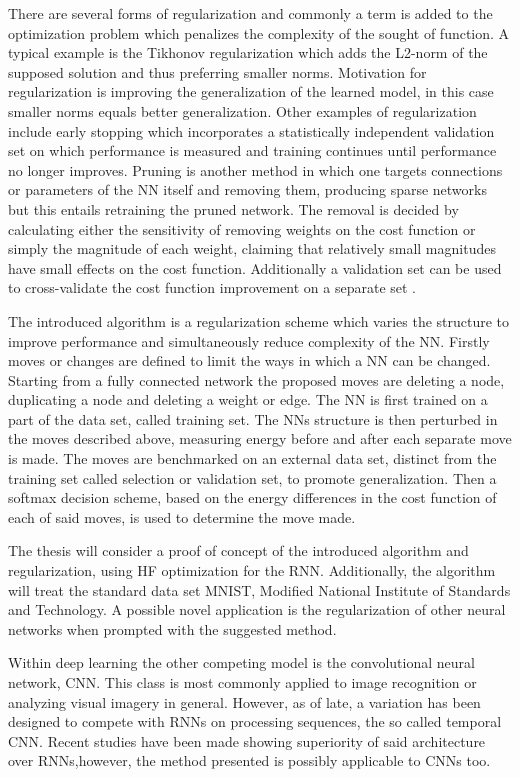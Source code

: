There are several forms of regularization and commonly a term is added to the optimization problem which penalizes the complexity of the sought of function. A typical example is the Tikhonov regularization which adds the L2-norm of the supposed solution and thus preferring smaller norms. Motivation for regularization is improving the generalization of the learned model, in this case smaller norms equals better generalization. Other examples of regularization include early stopping which incorporates a statistically independent validation set on which performance is measured and training continues until performance no longer improves. Pruning is another method in which one targets connections or parameters of the NN itself and removing them, producing sparse networks but this entails retraining the pruned network. The removal is decided by calculating either the sensitivity of removing weights on the cost function or simply the magnitude of each weight, claiming that relatively small magnitudes have small effects on the cost function. Additionally a validation set can be used to cross-validate the cost function improvement on a separate set \cite{prunings}. 

The introduced algorithm is a regularization scheme which varies the structure to improve performance and simultaneously reduce complexity of the NN. Firstly moves or changes are defined to limit the ways in which a NN can be changed. Starting from a fully connected network the proposed moves are deleting a node, duplicating a node and deleting a weight or edge. The NN is first trained on a part of the data set, called training set. The NNs structure is then perturbed in the moves described above, measuring energy before and after each separate move is made. The moves are benchmarked on an external data set, distinct from the training set called selection or validation set, to promote generalization. Then a softmax decision scheme, based on the energy differences in the cost function of each of said moves, is used to determine the move made. 

The thesis will consider a proof of concept of the introduced algorithm and regularization, using HF optimization for the RNN. Additionally, the algorithm will treat the standard data set MNIST, Modified National Institute of Standards and Technology\cite{mnist}. A possible novel application is the regularization of other neural networks when prompted with the suggested method.

Within deep learning the other competing model is the convolutional neural network, CNN. This class is most commonly applied to image recognition or analyzing visual imagery in general. However, as of late, a variation has been designed to compete with RNNs on processing sequences, the so called temporal CNN. Recent studies have been made showing superiority of said architecture over RNNs\cite{tcnvsrnn},however, the method presented is possibly applicable to CNNs too.

